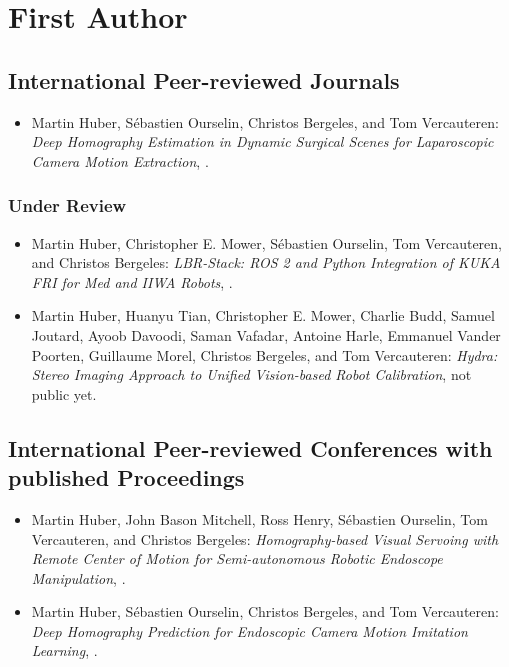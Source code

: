 \section{First Author}

\subsection{International Peer-reviewed Journals}
\begin{itemize}
    \item Martin Huber, S\'{e}bastien Ourselin, Christos Bergeles, and Tom Vercauteren: \textit{Deep Homography Estimation in Dynamic Surgical
Scenes for Laparoscopic Camera Motion Extraction}, \cite{huber2022deep}.
\end{itemize}

\subsubsection{Under Review}
\begin{itemize}
    \item Martin Huber, Christopher E. Mower, S\'{e}bastien Ourselin, Tom Vercauteren, and Christos Bergeles: \textit{LBR-Stack: ROS 2 and Python Integration of KUKA FRI for Med and
IIWA Robots}, \cite{huber2023lbr}.
    \item Martin Huber, Huanyu Tian, Christopher E. Mower, Charlie Budd, Samuel Joutard, Ayoob Davoodi, Saman Vafadar, Antoine Harle, Emmanuel Vander Poorten, Guillaume Morel, Christos Bergeles, and Tom Vercauteren: \textit{Hydra: Stereo Imaging Approach to Unified Vision-based Robot Calibration}, not public yet.
\end{itemize}

\subsection[International Peer-reviewed Conferences]{International Peer-reviewed Conferences with published Proceedings}
\begin{itemize}
    \item Martin Huber, John Bason Mitchell, Ross Henry, S\'{e}bastien Ourselin, Tom Vercauteren, and Christos Bergeles: \textit{Homography-based Visual Servoing with Remote Center of Motion for Semi-autonomous Robotic Endoscope Manipulation}, \cite{huber2021homographybased}.
    \item Martin Huber, S\'{e}bastien Ourselin, Christos Bergeles, and Tom Vercauteren: \textit{Deep Homography Prediction for Endoscopic Camera Motion Imitation Learning}, \cite{huber2023deep}.
\end{itemize}

